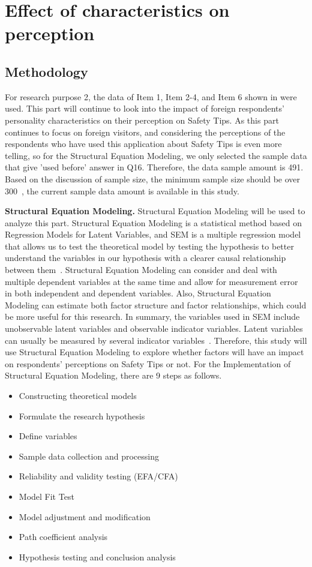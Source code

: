 \chapter{Effect of characteristics on perception}
\label{c5}

\section{Methodology}


For research purpose 2, the data of Item 1, Item 2-4, and Item 6 shown in  were used. This part will continue to look into the impact of foreign respondents' personality characteristics on their perception on Safety Tips. As this part continues to focus on foreign visitors, and considering the perceptions of the respondents who have used this application about Safety Tips is even more telling, so for the Structural Equation Modeling, we only selected the sample data that give 'used before' answer in Q16. Therefore, the data sample amount is 491. Based on the discussion of sample size, the minimum sample size should be over 300~\cite{ref15}, the current sample data amount is available in this study. 

\textbf{Structural Equation Modeling.} Structural Equation Modeling will be used to analyze this part. Structural Equation Modeling is a statistical method based on Regression Models for Latent Variables, and SEM is a multiple regression model that allows us to test the theoretical model by testing the hypothesis to better understand the variables in our hypothesis with a clearer causal relationship between them~\cite{ref13}. Structural Equation Modeling can consider and deal with multiple dependent variables at the same time and allow for measurement error in both independent and dependent variables. Also, Structural Equation Modeling can estimate both factor structure and factor relationships, which could be more useful for this research. In summary, the variables used in SEM include unobservable latent variables and observable indicator variables. Latent variables can usually be measured by several indicator variables~\cite{ref14}. Therefore, this study will use Structural Equation Modeling to explore whether factors will have an impact on respondents' perceptions on Safety Tips or not. For the Implementation of Structural Equation Modeling, there are 9 steps as follows. 

\begin{itemize}
\item Constructing theoretical models
\item Formulate the research hypothesis
\item Define variables
\item Sample data collection and processing
\item Reliability and validity testing (EFA/CFA)
\item Model Fit Test
\item Model adjustment and modification
\item Path coefficient analysis
\item Hypothesis testing and conclusion analysis
\end{itemize}


